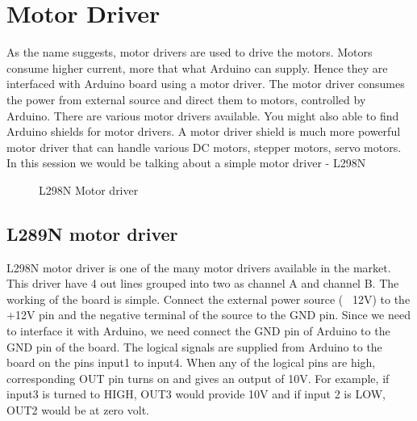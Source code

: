 \chapter{Motor Driver}
\label{chap:Motor_Driver}

\par As the name suggests, motor drivers are used to drive the motors. Motors consume higher current, more that what Arduino can supply. Hence they are interfaced with Arduino board using a motor driver. The motor driver consumes the power from external source and direct them to motors, controlled by Arduino. There are various motor drivers available. You might also able to find Arduino shields for motor drivers. A motor driver shield is much more powerful motor driver that can handle various DC motors, stepper motors, servo motors. In this session we would be talking about a simple motor driver - L298N

\begin{figure}
    \centering
    \qquad
    \caption[]{L298N Motor driver}
\end{figure}

\section{L289N motor driver}
\par L298N motor driver is one of the many motor drivers available in the market. This driver have 4 out lines grouped into two as channel A and channel B. The working of the board is simple. Connect the external power source ( ~12V) to the +12V pin and the negative terminal of the source to the GND pin. Since we need to interface it with Arduino, we need connect the GND pin of Arduino to the GND pin of the board. The logical signals are supplied from Arduino to the board on the pins input1 to input4. When any of the logical pins are high, corresponding OUT pin turns on and gives an output of 10V. For example, if input3 is turned to HIGH, OUT3 would provide 10V and if input 2 is LOW, OUT2 would be at zero volt.

